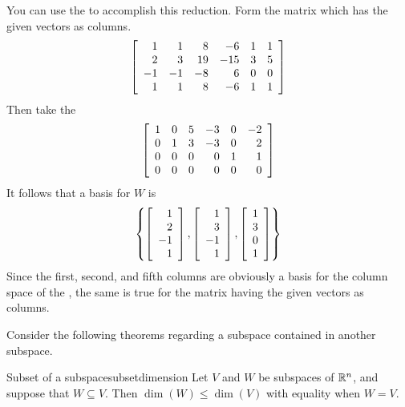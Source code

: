 \begin{solution}
You can use the {\rref} to accomplish this reduction. Form
the matrix which has the given vectors as columns. 
\begin{equation*}
\left[
\begin{array}{rrrrrr}
1 & 1 & 8 & -6 & 1 & 1 \\ 
2 & 3 & 19 & -15 & 3 & 5 \\ 
-1 & -1 & -8 & 6 & 0 & 0 \\ 
1 & 1 & 8 & -6 & 1 & 1
\end{array}
\right]
\end{equation*}
Then take the {\rref}
\begin{equation*}
\left[
\begin{array}{rrrrrr}
1 & 0 & 5 & -3 & 0 & -2 \\ 
0 & 1 & 3 & -3 & 0 & 2 \\ 
0 & 0 & 0 & 0 & 1 & 1 \\ 
0 & 0 & 0 & 0 & 0 & 0
\end{array}
\right]
\end{equation*}
It follows that a basis for $W$ is 
\begin{equation*}
\left\{ \left[ 
\begin{array}{r}
1 \\ 
2 \\ 
-1 \\ 
1
\end{array}
\right] ,\left[ 
\begin{array}{r}
1 \\ 
3 \\ 
-1 \\ 
1
\end{array}
\right] ,\left[ 
\begin{array}{c}
1 \\ 
3 \\ 
0 \\ 
1
\end{array}
\right] \right\}
\end{equation*}
Since the first, second, and fifth columns are
obviously a basis for the column space of the {\rref}, the same
is true for the matrix having the given vectors as columns. 
\end{solution}

Consider the following theorems regarding a subspace contained in another subspace. 

\begin{theorem}{Subset of a subspace}{subsetdimension}
Let $V$ and $W$ be subspaces of $\mathbb{R}^n$, and suppose that $W\subseteq V$.
Then  $\dim(W) \leq \dim(V)$ with equality when $W=V$.
\end{theorem}

